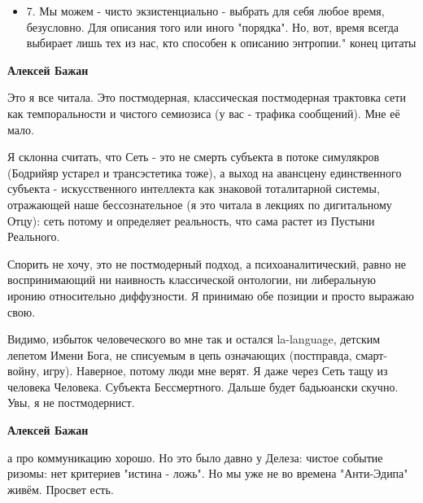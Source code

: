 \begin{itemize}
\begin{itemize}
\begin{itemize}
\item 7. Мы можем - чисто экзистенциально - выбрать для себя любое время, безусловно.
Для описания того или иного "порядка". Но, вот, время всегда выбирает лишь тех
из нас, кто способен к описанию энтропии." конец цитаты

\end{itemize}

 

\textbf{Алексей Бажан} 

Это я все читала. Это постмодерная, классическая постмодерная трактовка сети
как темпоральности и чистого семиозиса (у вас - трафика сообщений). Мне её
мало. 

Я склонна считать, что Сеть - это не смерть субъекта в потоке симулякров
(Бодрийяр устарел и трансэстетика тоже), а выход на авансцену единственного
субъекта - искусственного интеллекта как знаковой тоталитарной системы,
отражающей наше бессознательное (я это читала в лекциях по дигитальному Отцу):
сеть потому и определяет реальность, что сама растет из Пустыни Реального.

Спорить не хочу, это не постмодерный подход, а психоаналитический, равно не
воспринимающий ни наивность классической онтологии, ни либеральную иронию
относительно диффузности. Я принимаю обе позиции и просто выражаю свою. 

Видимо, избыток человеческого во мне так и остался la-language, детским лепетом
Имени Бога, не списуемым в цепь означающих (постправда, смарт-войну, игру).
Наверное, потому люди мне верят. Я даже через Сеть тащу из человека Человека.
Субъекта Бессмертного. Дальше будет бадьюански скучно. Увы, я не постмодернист.

 
\textbf{Алексей Бажан} 

а про коммуникацию хорошо. Но это было давно у Делеза: чистое событие ризомы:
нет критериев "истина - ложь". Но мы уже не во времена "Анти-Эдипа" живём.
Просвет есть.

 

\end{itemize}
\end{itemize}
